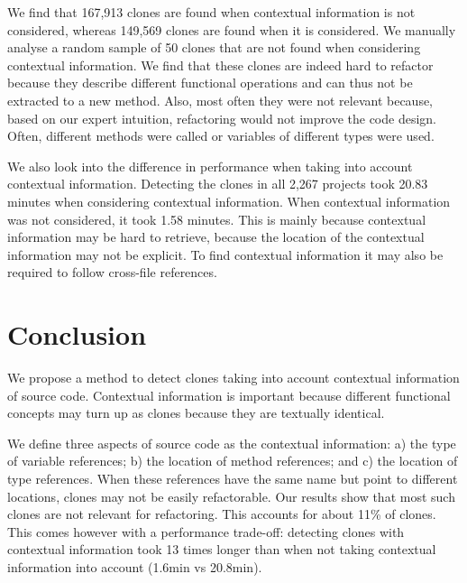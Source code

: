 \documentclass[conference]{IEEEtran}
\begin{document}
We find that 167,913 clones are found when contextual information is not considered, whereas 149,569 clones are found when it is considered. We manually analyse a random sample of 50 clones that are not found when considering contextual information. We find that these clones are indeed hard to refactor because they describe different functional operations and can thus not be extracted to a new method. Also, most often they were not relevant because, based on our expert intuition, refactoring would not improve the code design. Often, different methods were called or variables of different types were used.

We also look into the difference in performance when taking into account contextual information. Detecting the clones in all 2,267 projects took 20.83 minutes when considering contextual information. When contextual information was not considered, it took 1.58 minutes. This is mainly because contextual information may be hard to retrieve, because the location of the contextual information may not be explicit. To find contextual information it may also be required to follow cross-file references. %

\section{Conclusion}
We propose a method to detect clones taking into account contextual information of source code. Contextual information is important because different functional concepts may turn up as clones because they are textually identical.

We define three aspects of source code as the contextual information:  a) the type of variable references; b) the location of method references; and c) the location of type references. When these references have the same name but point to different locations, clones may not be easily refactorable. Our results show that most such clones are not relevant for refactoring. This accounts for about 11\% of clones. This comes however with a performance trade-off: detecting clones with contextual information took 13 times longer than when not taking contextual information into account (1.6min vs 20.8min).



\end{document}
